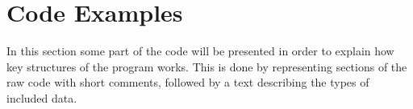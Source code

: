 \section{Code Examples}

In this section some part of the code will be presented in order to explain how key structures of the program works. This is done by representing sections of the raw code with short comments, followed by a text describing the types of included data.



